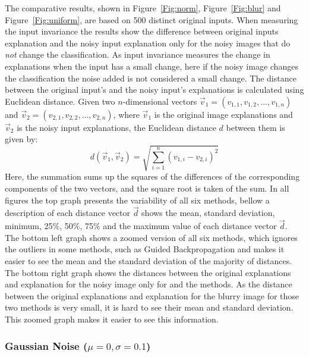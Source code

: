 The comparative results, shown in Figure~\ref{Fig:norm}, Figure~\ref{Fig:blur} and Figure~\ref{Fig:uniform}, are based on 500 distinct original inputs. When measuring the input invariance the results show the difference between original inputs explanation and the noisy input explanation only for the noisy images that do \emph{not} change the classification. As input invariance measures the change in explanations when the input has a small change, here if the noisy image changes the classification the noise added is not considered a small change. The distance between the original input's and the noisy input's explanations is calculated using Euclidean distance. Given two $n$-dimensional vectors \( \vec{v}_1 = (v_{1,1}, v_{1,2}, ..., v_{1,n}) \) and \( \vec{v}_2 = (v_{2,1}, v_{2,2}, ..., v_{2,n}) \), where $\vec{v}_1$ is the original image explanations and $ \vec{v}_2$ is the noisy input explanations, the Euclidean distance \( d \) between them is given by:
\begin{equation*}
    d(\vec{v}_1, \vec{v}_2) = \sqrt{\sum_{i=1}^{n} (v_{1,i} - v_{2,i})^2}
\end{equation*}
Here, the summation sums up the squares of the differences of the corresponding components of the two vectors, and the square root is taken of the sum. In all figures the top graph presents the variability of all six methods, bellow a description of each distance vector $\vec{d}$ shows the mean, standard deviation, minimum, 25\%, 50\%, 75\% and the maximum value of each distance vector $\vec{d}$. The bottom left graph shows a zoomed version of all six methods, which ignores the outliers in some methods, such as Guided Backpropagation and makes it easier to see the mean and the standard deviation of the majority of distances. The bottom right graph shows the distances between the original explanations and explanation for the noisy image only for \LRP\/ and the \CTC\/ methods. As the distance between the original explanations and explanation for the blurry image for those two methods is very small, it is hard to see their mean and standard deviation. This zoomed graph makes it easier to see this information.  

\subsubsection{Gaussian Noise ($\mu = 0, \sigma = 0.1$)}

